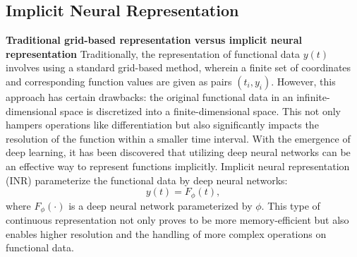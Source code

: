 \documentclass{article}
\begin{document}
\subsection{Implicit Neural Representation}

\textbf{Traditional grid-based representation versus implicit neural representation}
Traditionally, the representation of functional data $y(t)$ involves using a standard grid-based method, 
wherein a finite set of coordinates and corresponding function values are given as pairs $(t_i, y_i)$. 
However, this approach has certain drawbacks: the original functional data in an infinite-dimensional space is discretized into a finite-dimensional space. 
This not only hampers operations like differentiation but also significantly impacts the resolution of the function within a smaller time interval.
With the emergence of deep learning, it has been discovered that utilizing deep neural networks can be an effective way to represent functions implicitly.
Implicit neural representation (INR) parameterize the functional data by deep neural networks:
$$y(t)=F_\phi(t), $$
where $F_\phi(\cdot)$ is a deep neural network parameterized by $\phi$.
This type of continuous representation not only proves to be more memory-efficient but also enables higher resolution and the handling of more complex operations on functional data.
\end{document}
